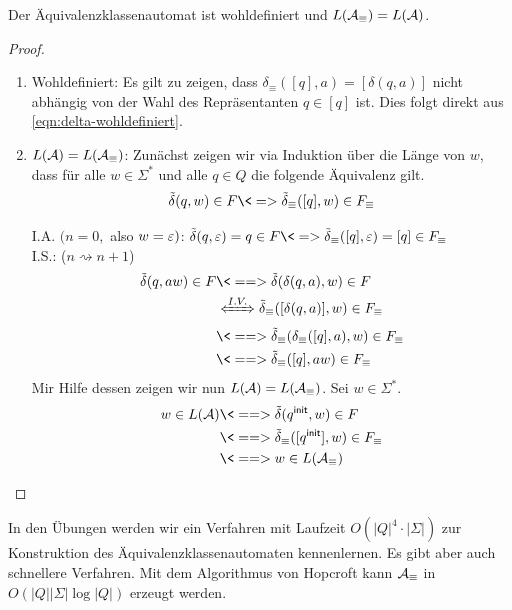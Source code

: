 \begin{Satz}[name={[Äquivalenzklassenautomat ist wohldefiniert]}]
        Der Äquivalenzklassenautomat ist wohldefiniert und $L(\mathcal{A}_\equiv)=L(\mathcal{A})$.
\end{Satz}


\begin{proof}\ 
        \begin{enumerate}
                \item Wohldefiniert: Es gilt zu zeigen, dass $\delta_\equiv([q],a) =[\delta(q,a)]$ nicht abhängig von der Wahl des Repräsentanten $q\in [q]$ ist. Dies folgt direkt aus \autoref{eqn:delta-wohldefiniert}.
                \item $L(\mathcal{A})=L(\mathcal{A}_\equiv)$:
                Zunächst zeigen wir via Induktion über die Länge von $w$, dass für alle $w\in\Sigma^*$ und alle $q\in Q$ die folgende Äquivalenz gilt.
                \[\tilde\delta(q,w)\in F \<=> \tilde\delta_\equiv([q],w)\in F_\equiv\]
                
                
                I.A. $(n=0,$ also $w=\varepsilon)$: $\tilde\delta(q,\Eps)=q\in F \<=> \tilde\delta_\equiv([q],\Eps)=[q]\in F_\equiv$\\
                I.S.: ($n\rightsquigarrow n+1$) \begin{align*}
                \tilde\delta(q,aw)\in F &\<==> \tilde\delta(\delta(q,a),w)\in F\\ &\xLeftrightarrow{I.V.} \tilde\delta_\equiv([\delta(q,a)],w)\in F_\equiv\\
                &\<==> \tilde\delta_\equiv(\delta_\equiv([q],a),w)\in F_\equiv\\
                &\<==> \tilde\delta_\equiv([q],a w)\in F_\equiv
                \end{align*}
                Mir Hilfe dessen zeigen wir nun $L(\mathcal{A})=L(\mathcal{A}_\equiv)$. Sei $w\in\Sigma^*$.
                \begin{align*}
                 w\in L(\A)
                 & \<==> \tilde\delta(\qinit,w) \in F\\
                 & \<==> \tilde\delta_\equiv([\qinit],w) \in F_\equiv\\
                 & \<==> w\in L(\A_\equiv)
                 \qedhere
                \end{align*}
        \end{enumerate}
\end{proof}
In den Übungen werden wir ein Verfahren mit Laufzeit $O(|Q|^4\cdot |\Sigma|)$ zur Konstruktion des Äquivalenzklassenautomaten kennenlernen. Es gibt aber auch schnellere Verfahren. Mit dem Algorithmus von Hopcroft kann $\mathcal{A}_\equiv$ in $O(|Q||\Sigma|\log|Q|)$ erzeugt werden.

